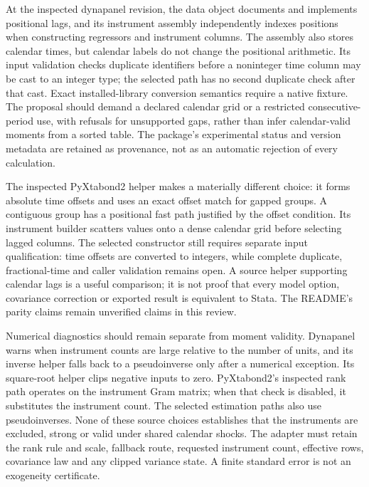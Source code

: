 At the inspected dynapanel revision, the data object documents and implements positional lags, and its instrument assembly independently indexes positions when constructing regressors and instrument columns. The assembly also stores calendar times, but calendar labels do not change the positional arithmetic. Its input validation checks duplicate identifiers before a noninteger time column may be cast to an integer type; the selected path has no second duplicate check after that cast. Exact installed-library conversion semantics require a native fixture. The proposal should demand a declared calendar grid or a restricted consecutive-period use, with refusals for unsupported gaps, rather than infer calendar-valid moments from a sorted table. The package's experimental status and version metadata are retained as provenance, not as an automatic rejection of every calculation.~\citep{exec25_pydyn_dynapanel}

The inspected PyXtabond2 helper makes a materially different choice: it forms absolute time offsets and uses an exact offset match for gapped groups. A contiguous group has a positional fast path justified by the offset condition. Its instrument builder scatters values onto a dense calendar grid before selecting lagged columns. The selected constructor still requires separate input qualification: time offsets are converted to integers, while complete duplicate, fractional-time and caller validation remains open. A source helper supporting calendar lags is a useful comparison; it is not proof that every model option, covariance correction or exported result is equivalent to Stata. The README's parity claims remain unverified claims in this review.~\citep{exec25_pydyn_xtabond}

Numerical diagnostics should remain separate from moment validity. Dynapanel warns when instrument counts are large relative to the number of units, and its inverse helper falls back to a pseudoinverse only after a numerical exception. Its square-root helper clips negative inputs to zero. PyXtabond2's inspected rank path operates on the instrument Gram matrix; when that check is disabled, it substitutes the instrument count. The selected estimation paths also use pseudoinverses. None of these source choices establishes that the instruments are excluded, strong or valid under shared calendar shocks. The adapter must retain the rank rule and scale, fallback route, requested instrument count, effective rows, covariance law and any clipped variance state. A finite standard error is not an exogeneity certificate.~\citep{exec25_pydyn_dynapanel,exec25_pydyn_xtabond,exec25_pydyn_choice}

